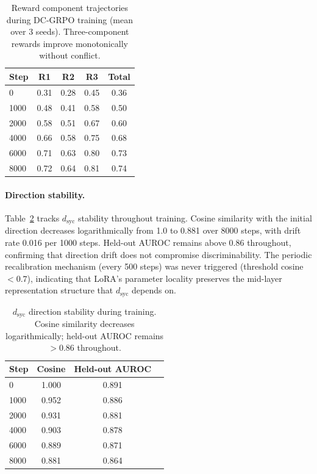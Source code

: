 \documentclass[11pt,a4paper]{article}
\newcommand{\dsyc}{d_{\text{syc}}}
\begin{document}
\begin{table}[t]
\centering
\small
\begin{tabular}{lcccc}
\toprule
\textbf{Step} & \textbf{R1} & \textbf{R2} & \textbf{R3} & \textbf{Total} \\
\midrule
0 & 0.31 & 0.28 & 0.45 & 0.36 \\
1000 & 0.48 & 0.41 & 0.58 & 0.50 \\
2000 & 0.58 & 0.51 & 0.67 & 0.60 \\
4000 & 0.66 & 0.58 & 0.75 & 0.68 \\
6000 & 0.71 & 0.63 & 0.80 & 0.73 \\
8000 & 0.72 & 0.64 & 0.81 & 0.74 \\
\bottomrule
\end{tabular}
\caption{Reward component trajectories during DC-GRPO training (mean over 3 seeds). Three-component rewards improve monotonically without conflict.}
\label{tab:training_dynamics}
\end{table}

\paragraph{Direction stability.}
Table~\ref{tab:direction_stability} tracks $\dsyc$ stability throughout training. Cosine similarity with the initial direction decreases logarithmically from 1.0 to 0.881 over 8000 steps, with drift rate 0.016 per 1000 steps. Held-out AUROC remains above 0.86 throughout, confirming that direction drift does not compromise discriminability. The periodic recalibration mechanism (every 500 steps) was never triggered (threshold cosine $< 0.7$), indicating that LoRA's parameter locality preserves the mid-layer representation structure that $\dsyc$ depends on.

\begin{table}[t]
\centering
\small
\begin{tabular}{lccc}
\toprule
\textbf{Step} & \textbf{Cosine} & \textbf{Held-out AUROC} \\
\midrule
0 & 1.000 & 0.891 \\
1000 & 0.952 & 0.886 \\
2000 & 0.931 & 0.881 \\
4000 & 0.903 & 0.878 \\
6000 & 0.889 & 0.871 \\
8000 & 0.881 & 0.864 \\
\bottomrule
\end{tabular}
\caption{$\dsyc$ direction stability during training. Cosine similarity decreases logarithmically; held-out AUROC remains $> 0.86$ throughout.}
\label{tab:direction_stability}
\end{table}
\end{document}
